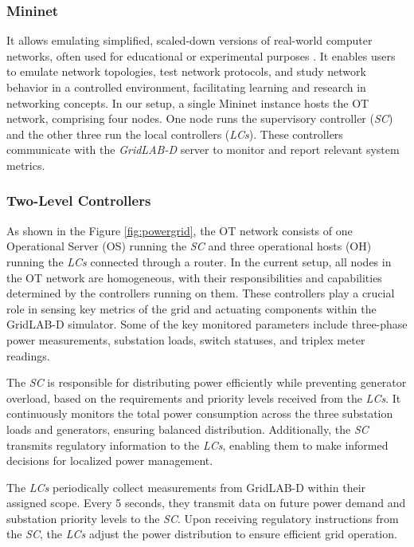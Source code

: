 \subsubsection{Mininet} It allows emulating simplified, scaled-down versions of real-world computer networks, often used for educational or experimental purposes \cite{10.1145/1868447.1868466}. It enables users to emulate network topologies, test network protocols, and study network behavior in a controlled environment, facilitating learning and research in networking concepts. In our setup, a single Mininet instance hosts the OT network, comprising four nodes. One node runs the supervisory controller (\textit{SC}) and the other three run the local controllers (\textit{LCs}). These controllers communicate with the \textit{GridLAB-D} server to monitor and report relevant system metrics.


\subsubsection{Two-Level Controllers} As shown in the Figure \ref{fig:powergrid}, the OT network consists of one Operational Server (OS) running the \textit{SC} and three operational hosts (OH) running the \textit{LCs} connected through a router. In the current setup, all nodes in the OT network are homogeneous, with their responsibilities and capabilities determined by the controllers running on them. These controllers play a crucial role in sensing key metrics of the grid and actuating components within the GridLAB-D simulator. Some of the key monitored parameters include three-phase power measurements, substation loads, switch statuses, and triplex meter readings.

The \textit{SC} is responsible for distributing power efficiently while preventing generator overload, based on the requirements and priority levels received from the \textit{LCs}. It continuously monitors the total power consumption across the three substation loads and generators, ensuring balanced distribution. 
Additionally, the \textit{SC} transmits regulatory information to the \textit{LCs}, enabling them to make informed decisions for localized power management.

The \textit{LCs} periodically collect measurements from GridLAB-D within their assigned scope. Every 5 seconds, they transmit data on future power demand and substation priority levels to the \textit{SC}. Upon receiving regulatory instructions from the \textit{SC}, the \textit{LCs} adjust the power distribution to ensure efficient grid operation.


